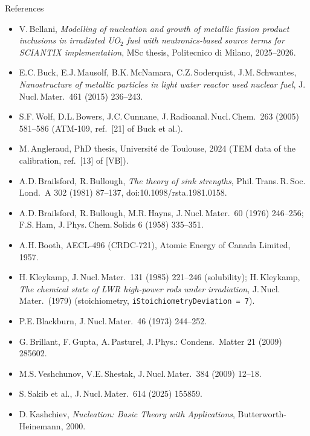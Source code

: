\documentclass[aspectratio=169,10pt]{beamer}
\begin{document}
\begin{frame}{References}
  \scriptsize
  \begin{itemize}
    \item[{[VB]}] V.\,Bellani, \emph{Modelling of nucleation and growth of metallic fission product inclusions in irradiated UO$_2$ fuel with
      neutronics-based source terms for SCIANTIX implementation}, MSc thesis, Politecnico di Milano, 2025--2026.
    \item E.C.\,Buck, E.J.\,Mausolf, B.K.\,McNamara, C.Z.\,Soderquist, J.M.\,Schwantes, \emph{Nanostructure of metallic particles in light water
      reactor used nuclear fuel}, J.\,Nucl.\,Mater.\ 461 (2015) 236--243.
    \item S.F.\,Wolf, D.L.\,Bowers, J.C.\,Cunnane, J.\,Radioanal.\,Nucl.\,Chem.\ 263 (2005) 581--586 (ATM-109, ref.\ [21] of Buck et al.).
    \item M.\,Angleraud, PhD thesis, Université de Toulouse, 2024 (TEM data of the calibration, ref.\ [13] of [VB]).
    \item A.D.\,Brailsford, R.\,Bullough, \emph{The theory of sink strengths}, Phil.\,Trans.\,R.\,Soc.\,Lond.\ A 302 (1981) 87--137,
      doi:10.1098/rsta.1981.0158.
    \item A.D.\,Brailsford, R.\,Bullough, M.R.\,Hayns, J.\,Nucl.\,Mater.\ 60 (1976) 246--256; F.S.\,Ham, J.\,Phys.\,Chem.\,Solids 6 (1958) 335--351.
    \item A.H.\,Booth, AECL-496 (CRDC-721), Atomic Energy of Canada Limited, 1957.
    \item H.\,Kleykamp, J.\,Nucl.\,Mater.\ 131 (1985) 221--246 (solubility); H.\,Kleykamp, \emph{The chemical state of LWR high-power rods under
      irradiation}, J.\,Nucl.\,Mater.\ (1979) (stoichiometry, \texttt{iStoichiometryDeviation = 7}).
    \item P.E.\,Blackburn, J.\,Nucl.\,Mater.\ 46 (1973) 244--252.
    \item G.\,Brillant, F.\,Gupta, A.\,Pasturel, J.\,Phys.: Condens.\ Matter 21 (2009) 285602.
    \item M.S.\,Veshchunov, V.E.\,Shestak, J.\,Nucl.\,Mater.\ 384 (2009) 12--18.
    \item S.\,Sakib et al., J.\,Nucl.\,Mater.\ 614 (2025) 155859.
    \item D.\,Kashchiev, \emph{Nucleation: Basic Theory with Applications}, Butterworth-Heinemann, 2000.
  \end{itemize}
\end{frame}
\end{document}
